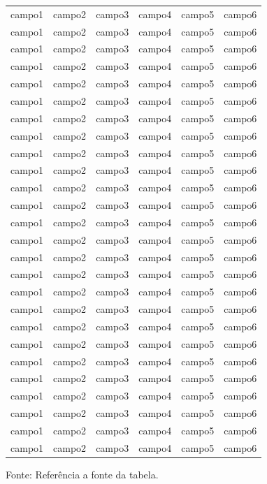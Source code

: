 \begin{longtable}[c]{c|c|c|c|c|c}
	campo1 & campo2 & campo3 & campo4 & campo5 & campo6 \\
	campo1 & campo2 & campo3 & campo4 & campo5 & campo6 \\
	campo1 & campo2 & campo3 & campo4 & campo5 & campo6 \\
	campo1 & campo2 & campo3 & campo4 & campo5 & campo6 \\
	campo1 & campo2 & campo3 & campo4 & campo5 & campo6 \\
	campo1 & campo2 & campo3 & campo4 & campo5 & campo6 \\
	campo1 & campo2 & campo3 & campo4 & campo5 & campo6 \\
	campo1 & campo2 & campo3 & campo4 & campo5 & campo6 \\
	campo1 & campo2 & campo3 & campo4 & campo5 & campo6 \\
	campo1 & campo2 & campo3 & campo4 & campo5 & campo6 \\
	campo1 & campo2 & campo3 & campo4 & campo5 & campo6 \\
	campo1 & campo2 & campo3 & campo4 & campo5 & campo6 \\
	campo1 & campo2 & campo3 & campo4 & campo5 & campo6 \\
	campo1 & campo2 & campo3 & campo4 & campo5 & campo6 \\
	campo1 & campo2 & campo3 & campo4 & campo5 & campo6 \\
	campo1 & campo2 & campo3 & campo4 & campo5 & campo6 \\
	campo1 & campo2 & campo3 & campo4 & campo5 & campo6 \\
	campo1 & campo2 & campo3 & campo4 & campo5 & campo6 \\
	campo1 & campo2 & campo3 & campo4 & campo5 & campo6 \\
	campo1 & campo2 & campo3 & campo4 & campo5 & campo6 \\
	campo1 & campo2 & campo3 & campo4 & campo5 & campo6 \\
	campo1 & campo2 & campo3 & campo4 & campo5 & campo6 \\
	campo1 & campo2 & campo3 & campo4 & campo5 & campo6 \\
	campo1 & campo2 & campo3 & campo4 & campo5 & campo6 \\
	campo1 & campo2 & campo3 & campo4 & campo5 & campo6 \\
	campo1 & campo2 & campo3 & campo4 & campo5 & campo6 \\
\hline
\end{longtable}
\vspace{-8mm}
\begin{center}
\footnotesize
Fonte: Referência a fonte da tabela.
\end{center}

